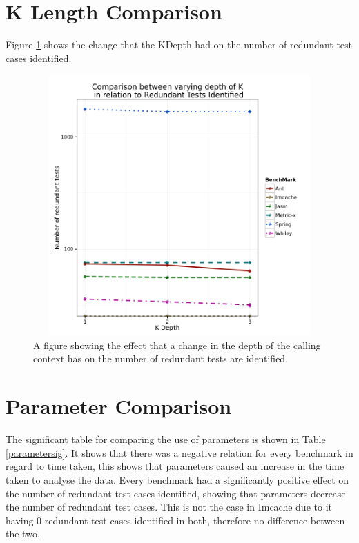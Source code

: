 \section{K Length Comparison}

Figure \ref{fig:kdepthgraph} shows the change that the KDepth had on the number of redundant test cases identified. 

\begin{figure}[H]
\begin{center}
\includegraphics[height=10cm, width = 14.5cm]{KDepth.png}
\end{center}
\caption{A figure showing the effect that a change in the depth of the calling context has on the number of redundant tests are identified.}
\label{fig:kdepthgraph}
\end{figure}

\section{Parameter Comparison}

The significant table for comparing the use of parameters is shown in Table \ref{parametersig}. It shows that there was a negative relation for every benchmark in regard to time taken, this shows that parameters caused an increase in the time taken to analyse the data. Every benchmark had a significantly positive effect on the number of redundant test cases identified, showing that parameters decrease the number of redundant test cases. This is not the case in Imcache due to it having 0 redundant test cases identified in both, therefore no difference between the two.



